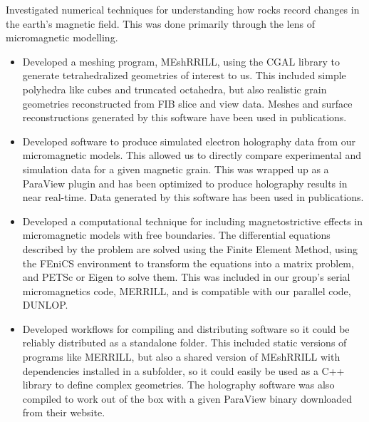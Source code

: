 \documentclass[11pt]{article}
\newenvironment{resumeSubSectionBody}{
    \par
    \vspace{-0.8\parskip}
    \begin{small}
    \par
} {
    \par
    \end{small}
    \par
}
\begin{document}
\begin{resumeSubSectionBody}

    Investigated numerical techniques for understanding how rocks record
    changes in the earth's magnetic field. This was done primarily through
    the lens of micromagnetic modelling.

    \begin{itemize}
        \item
            Developed a meshing program, MEshRRILL, using the CGAL library to
            generate tetrahedralized geometries of interest to us. This included
            simple polyhedra like cubes and truncated octahedra, but also
            realistic grain geometries reconstructed from FIB slice and view
            data. Meshes and surface reconstructions generated by this
            software have been used in publications.

        \item
            Developed software to produce simulated electron holography data
            from our micromagnetic models. This allowed us to directly compare
            experimental and simulation data for a given magnetic grain. This
            was wrapped up as a ParaView plugin and has been optimized to
            produce holography results in near real-time.
            Data generated by this software has been used in publications.

        \item
            Developed a computational technique for including magnetostrictive
            effects in micromagnetic models with free boundaries.
            The differential equations described by the problem are solved
            using the Finite Element Method, using the FEniCS environment
            to transform the equations into a matrix problem, and
            PETSc or Eigen to solve them.
            This was included in our group's serial micromagnetics code, MERRILL,
            and is compatible with our parallel code, DUNLOP.

        \item
            Developed workflows for compiling and distributing software so
            it could be reliably distributed as a standalone folder. This
            included static versions of programs like MERRILL, but also
            a shared version of MEshRRILL with dependencies installed in a
            subfolder, so it could easily be used as a C++ library to
            define complex geometries. The holography software was also compiled
            to work out of the box with a given ParaView binary downloaded
            from their website.
    \end{itemize}

\end{resumeSubSectionBody}
\end{document}
